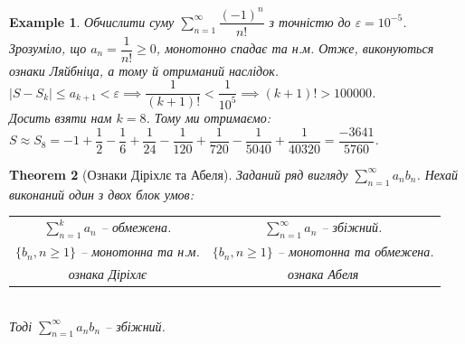 \documentclass[a4paper, 10pt]{article}
\def\huge{\displaystyle}
\theoremstyle{theoremdd}
\newtheorem{theorem}{Theorem}[subsection]
\theoremstyle{theoremdd}
\theoremstyle{theoremdd}
\theoremstyle{theoremdd}
\theoremstyle{theoremdd}
\newtheorem{example}[theorem]{Example}
\theoremstyle{theoremdd}
\theoremstyle{theoremdd}
\theoremstyle{theoremdd}
\theoremstyle{theoremdd}
\begin{document}
\begin{example}
Обчислити суму $\huge\sum_{n=1}^\infty \dfrac{(-1)^n}{n!}$ з точністю до $\varepsilon = 10^{-5}$.\\
Зрозуміло, що $a_n = \dfrac{1}{n!} \geq 0$, монотонно спадає та н.м. Отже, виконуються ознаки Ляйбніца, а тому й отриманий наслідок.\\
$|S-S_k| \leq a_{k+1} < \varepsilon \implies \dfrac{1}{(k+1)!} < \dfrac{1}{10^5} \implies (k+1)! > 100000$.\\
Досить взяти нам $k = 8$. Тому ми отримаємо:\\
$S \approx S_8 = -1 + \dfrac{1}{2} - \dfrac{1}{6} + \dfrac{1}{24} - \dfrac{1}{120} + \dfrac{1}{720} - \dfrac{1}{5040} + \dfrac{1}{40320} = \dfrac{-3641}{5760}$.
\end{example}

\begin{theorem}[Ознаки Діріхлє та Абеля]
Заданий ряд вигляду $\huge \sum_{n=1}^{\infty} a_n b_n$. Нехай виконаний один з двох блок умов:\\
\begin{tabular}{c | c}
$\huge\sum_{n=1}^k a_n$ -- обмежена. & $\huge \sum_{n=1}^{\infty} a_n$ -- збіжний. \\
$\{b_n, n \geq 1\}$ -- монотонна та н.м. & $\{b_n, n \geq 1\}$ -- монотонна та обмежена.\\
\textit{ознака Діріхлє} & \textit{ознака Абеля}
\end{tabular} \\
Тоді $\huge \sum_{n=1}^{\infty} a_n b_n$ -- збіжний.
\end{theorem}
\end{document}
